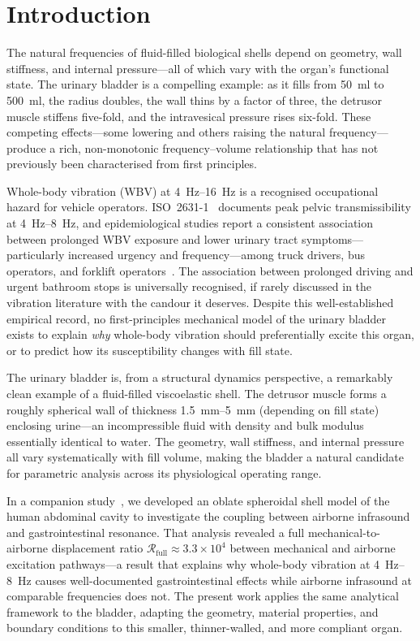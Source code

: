 \section{Introduction}
\label{sec:introduction}

The natural frequencies of fluid-filled biological shells depend on geometry,
wall stiffness, and internal pressure---all of which vary with the organ's
functional state.  The urinary bladder is a compelling example: as it fills
from \SI{50}{\milli\litre} to \SI{500}{\milli\litre}, the radius doubles,
the wall thins by a factor of three, the detrusor muscle stiffens five-fold,
and the intravesical pressure rises six-fold.  These competing effects---some
lowering and others raising the natural frequency---produce a rich,
non-monotonic frequency--volume relationship that has not previously been
characterised from first principles.

Whole-body vibration (WBV) at \SIrange{4}{16}{\hertz} is a recognised
occupational hazard for vehicle operators.  ISO~2631-1~\cite{iso2631}
documents peak pelvic transmissibility at \SIrange{4}{8}{\hertz}, and
epidemiological studies report a consistent association between prolonged WBV
exposure and lower urinary tract symptoms---particularly increased urgency and
frequency---among truck drivers, bus operators, and forklift
operators~\cite{Seidel1986,Griffin1990}.  The association between prolonged
driving and urgent bathroom stops is universally recognised, if rarely
discussed in the vibration literature with the candour it deserves.
Despite this well-established
empirical record, no first-principles mechanical model of the urinary bladder
exists to explain \emph{why} whole-body vibration should preferentially excite
this organ, or to predict how its susceptibility changes with fill state.

The urinary bladder is, from a structural dynamics perspective, a remarkably
clean example of a fluid-filled viscoelastic shell.  The detrusor muscle forms
a roughly spherical wall of thickness \SIrange{1.5}{5}{\milli\metre}
(depending on fill state) enclosing urine---an incompressible fluid with
density and bulk modulus essentially identical to water.  The geometry, wall
stiffness, and internal pressure all vary systematically with fill volume,
making the bladder a natural candidate for parametric analysis across its
physiological operating range.

In a companion study~\cite{Mace2026browntone}, we developed an oblate
spheroidal shell model of the human abdominal cavity to investigate the
coupling between airborne infrasound and gastrointestinal resonance.  That
analysis revealed a full mechanical-to-airborne displacement ratio
$\mathcal{R}_\mathrm{full} \approx 3.3 \times 10^4$
between mechanical and airborne excitation pathways---a result that explains
why whole-body vibration at \SIrange{4}{8}{\hertz} causes well-documented
gastrointestinal effects while airborne infrasound at comparable frequencies
does not.  The present work applies the same analytical framework to the
bladder, adapting the geometry, material properties, and boundary conditions to
this smaller, thinner-walled, and more compliant organ.

